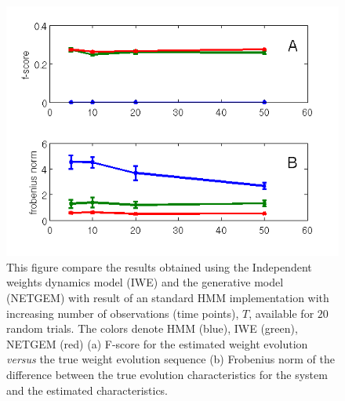 \documentclass{bioinfo}
\begin{document}
\begin{figure}[htp]
  \centering
  \includegraphics[scale=0.55]{results/mm_tvar}
  \caption{This figure compare the results obtained using the Independent weights dynamics model (IWE)
    and the generative model (NETGEM) with result of an standard HMM  implementation with
    increasing number of observations (time points), $T$,
    available for $20$ random trials. The colors denote HMM (blue), IWE (green),
    NETGEM (red)   (a) F-score for the estimated weight evolution {\it versus} the true
    weight evolution sequence (b) Frobenius norm of the difference between the true
    evolution characteristics for the system and the estimated characteristics. }
  \label{fig:validation-t}
\end{figure}
\end{document}
